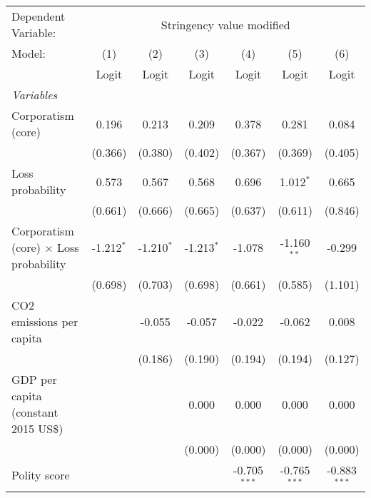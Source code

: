 
\begingroup
\centering
\begin{tabular}{lcccccc}
   \toprule
   Dependent Variable: & \multicolumn{6}{c}{Stringency value modified}\\
   Model:                                        & (1)          & (2)          & (3)          & (4)            & (5)            & (6)\\  
                                                 &  Logit       & Logit        & Logit        & Logit          & Logit          & Logit\\  
   \midrule
   \emph{Variables}\\
   Corporatism (core)                            & 0.196        & 0.213        & 0.209        & 0.378          & 0.281          & 0.084\\   
                                                 & (0.366)      & (0.380)      & (0.402)      & (0.367)        & (0.369)        & (0.405)\\   
   Loss probability                              & 0.573        & 0.567        & 0.568        & 0.696          & 1.012$^{*}$    & 0.665\\   
                                                 & (0.661)      & (0.666)      & (0.665)      & (0.637)        & (0.611)        & (0.846)\\   
   Corporatism (core) $\times$ Loss probability  & -1.212$^{*}$ & -1.210$^{*}$ & -1.213$^{*}$ & -1.078         & -1.160$^{**}$  & -0.299\\   
                                                 & (0.698)      & (0.703)      & (0.698)      & (0.661)        & (0.585)        & (1.101)\\   
   CO2 emissions per capita                      &              & -0.055       & -0.057       & -0.022         & -0.062         & 0.008\\   
                                                 &              & (0.186)      & (0.190)      & (0.194)        & (0.194)        & (0.127)\\   
   GDP per capita (constant 2015 US\$)           &              &              & 0.000        & 0.000          & 0.000          & 0.000\\   
                                                 &              &              & (0.000)      & (0.000)        & (0.000)        & (0.000)\\   
   Polity score                                  &              &              &              & -0.705$^{***}$ & -0.765$^{***}$ & -0.883$^{***}$\\   

\end{tabular}
